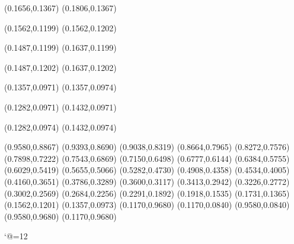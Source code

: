 \PST@Dashed(0.1656,0.1367)
(0.1806,0.1367)

\PST@Dashed(0.1562,0.1199)
(0.1562,0.1202)

\PST@Dashed(0.1487,0.1199)
(0.1637,0.1199)

\PST@Dashed(0.1487,0.1202)
(0.1637,0.1202)

\PST@Dashed(0.1357,0.0971)
(0.1357,0.0974)

\PST@Dashed(0.1282,0.0971)
(0.1432,0.0971)

\PST@Dashed(0.1282,0.0974)
(0.1432,0.0974)

\PST@Diamond(0.9580,0.8867)
\PST@Diamond(0.9393,0.8690)
\PST@Diamond(0.9038,0.8319)
\PST@Diamond(0.8664,0.7965)
\PST@Diamond(0.8272,0.7576)
\PST@Diamond(0.7898,0.7222)
\PST@Diamond(0.7543,0.6869)
\PST@Diamond(0.7150,0.6498)
\PST@Diamond(0.6777,0.6144)
\PST@Diamond(0.6384,0.5755)
\PST@Diamond(0.6029,0.5419)
\PST@Diamond(0.5655,0.5066)
\PST@Diamond(0.5282,0.4730)
\PST@Diamond(0.4908,0.4358)
\PST@Diamond(0.4534,0.4005)
\PST@Diamond(0.4160,0.3651)
\PST@Diamond(0.3786,0.3289)
\PST@Diamond(0.3600,0.3117)
\PST@Diamond(0.3413,0.2942)
\PST@Diamond(0.3226,0.2772)
\PST@Diamond(0.3002,0.2569)
\PST@Diamond(0.2684,0.2256)
\PST@Diamond(0.2291,0.1892)
\PST@Diamond(0.1918,0.1535)
\PST@Diamond(0.1731,0.1365)
\PST@Diamond(0.1562,0.1201)
\PST@Diamond(0.1357,0.0973)
\PST@Border(0.1170,0.9680)
(0.1170,0.0840)
(0.9580,0.0840)
(0.9580,0.9680)
(0.1170,0.9680)

\catcode`@=12
\fi
\endpspicture
